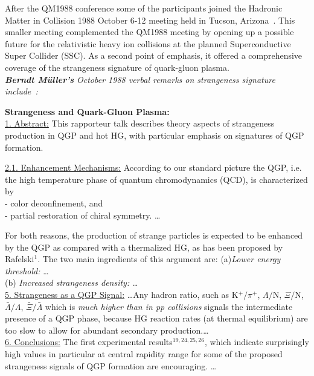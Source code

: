After the QM1988 conference some of the participants joined the Hadronic Matter in Collision 1988 October 6-12 meeting held in Tucson, Arizona~\cite{Carruthers:1989sx}. This smaller meeting complemented the QM1988 meeting by opening up a possible future for the relativistic heavy ion collisions at the planned Superconductive Super Collider (SSC). As a second point of emphasis, it offered a comprehensive coverage of the strangeness signature of quark-gluon plasma.\\

\noindent \textit{\textbf{Berndt M\"uller\rq s} October 1988 verbal remarks on strangeness signature include~\cite{Muller:1988mj}:}\\[-0.7cm]
%
\begin{mdframed}[linecolor=gray,roundcorner=12pt,backgroundcolor=GreenYellow!15,linewidth=1pt,leftmargin=0cm,rightmargin=0cm,topline=true,bottomline=true,skipabove=12pt]\relax%
%
%
\textbf{Strangeness and Quark-Gluon Plasma:}\\ 
\noindent \underline{1. Abstract:} 
This rapporteur talk describes theory aspects of strangeness 
production in QGP and hot HG, with particular emphasis on signatures 
of QGP formation. 

\noindent \underline{2.1. Enhancement Mechanisms:}
According to our standard picture the QGP, i.e. the high 
temperature phase of quantum chromodynamics (QCD), is characterized by\\ 
- color deconfinement, and\\ 
- partial restoration of chiral symmetry. \ldots 
 
For both reasons, the production of strange particles
is expected to be enhanced by the QGP as compared with a 
thermalized HG, as has been proposed by Rafelski$^1$. The two main ingredients of this argument are: 
 (a){\it Lower energy threshold:} \ldots\\
(b) {\it Increased strangeness density:} \ldots\\

\noindent \underline{5. Strangeness as a QGP Signal:}
\ldots Any hadron ratio, such as K$^+/\pi^+$, $\Lambda/$N, $\Xi/$N, 
$\bar\Lambda/\Lambda$, $\bar\Xi/\bar\Lambda$ which is 
{\it much higher than in pp collisions} 
signals the intermediate presence of a QGP phase, because HG reaction 
rates (at thermal equilibrium) are too slow to allow for abundant 
secondary production.\ldots\\

\noindent \underline{6. Conclusions:}
The first experimental results$^{19,24,25,26}$, which indicate surprisingly high values in particular at central rapidity range for some of the proposed strangeness signals of QGP formation are encouraging. \ldots 
%


\end{mdframed}
